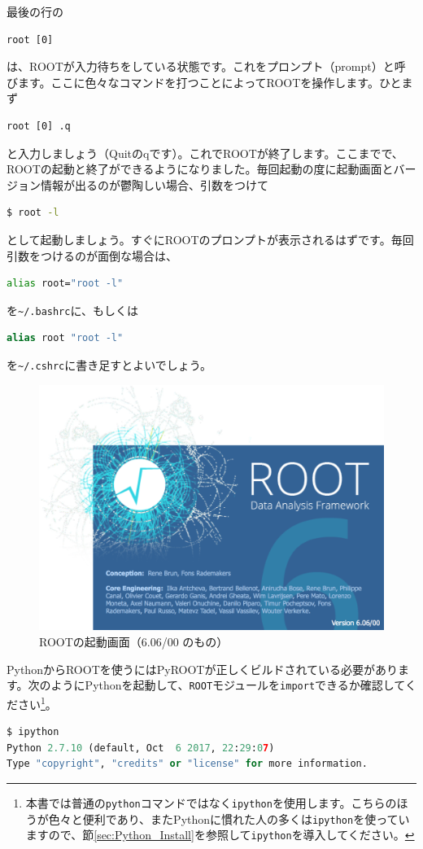{最後の行の
\begin{lstlisting}
root [0]
\end{lstlisting}
は、ROOTが入力待ちをしている状態です。これをプロンプト（prompt）と呼びます。ここに色々なコマンドを打つことによってROOTを操作します。ひとまず
\begin{lstlisting}
root [0] .q
\end{lstlisting}
と入力しましょう（Quitのqです）。これでROOTが終了します。ここまでで、ROOTの起動と終了ができるようになりました。毎回起動の度に起動画面とバージョン情報が出るのが鬱陶しい場合、引数をつけて
\begin{lstlisting}[language=bash]
$ root -l
\end{lstlisting}
として起動しましょう。すぐにROOTのプロンプトが表示されるはずです。毎回引数をつけるのが面倒な場合は、
\begin{lstlisting}[language=bash]
alias root="root -l"
\end{lstlisting}
を\texttt{\~{}/.bashrc}に、もしくは
\begin{lstlisting}[language=csh]
alias root "root -l"
\end{lstlisting}
を\texttt{\~{}/.cshrc}に書き足すとよいでしょう。

\begin{figure}
  \centering
  \includegraphics[width=12cm]{fig/splash6.png}
  \caption{ROOTの起動画面（6.06/00 のもの）}
  \label{fig:splash}
\end{figure}

PythonからROOTを使うにはPyROOTが正しくビルドされている必要があります。次のようにPythonを起動して、\texttt{ROOT}モジュールを\texttt{import}できるか確認してください\footnote{本書では普通の\texttt{python}コマンドではなく\texttt{ipython}を使用します。こちらのほうが色々と便利であり、またPythonに慣れた人の多くは\texttt{ipython}を使っていますので、節\ref{sec:Python_Install}を参照して\texttt{ipython}を導入してください。}。
\begin{lstlisting}[language=python]
$ ipython
Python 2.7.10 (default, Oct  6 2017, 22:29:07) 
Type "copyright", "credits" or "license" for more information.


\end{lstlisting}}
